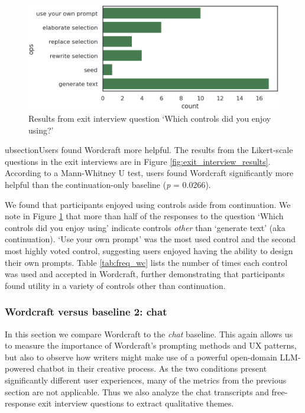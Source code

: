 \begin{figure}[tbp]
  \centering
  \includegraphics[width=0.8\linewidth]{figures/favorite_ops.png}
  \caption{Results from exit interview question `Which controls did you enjoy using?'}
  \label{fig:favorite_ops}
\end{figure}

ubsection{Users found Wordcraft more helpful.}
The results from the Likert-scale questions in the exit interviews are in Figure \ref{fig:exit_interview_results}. According to a Mann-Whitney U test, users found Wordcraft significantly more helpful than the continuation-only baseline (\textit{p} = 0.0266).

We found that participants enjoyed using controls aside from continuation.
We note in Figure \ref{fig:favorite_ops} that more than half of the responses to the question `Which controls did you enjoy using' indicate controls \textit{other} than `generate text' (aka continuation). `Use your own prompt' was the most used control and the second most highly voted control, suggesting users enjoyed having the ability to design their own prompts. Table \ref{tab:freq_wc} lists the number of times each control was used and accepted in Wordcraft, further demonstrating that participants found utility in a variety of controls other than continuation. 

\subsubsection{Wordcraft versus baseline 2: chat}
In this section we compare Wordcraft to the \textit{chat} baseline. 
This again allows us to measure the importance of Wordcraft's prompting methods and UX patterns, but also to observe how writers might make use of a powerful open-domain LLM-powered chatbot in their creative process.
As the two conditions present significantly different user experiences, many of the metrics from the previous section are not applicable.
Thus we also analyze the chat transcripts and free-response exit interview questions to extract qualitative themes.

